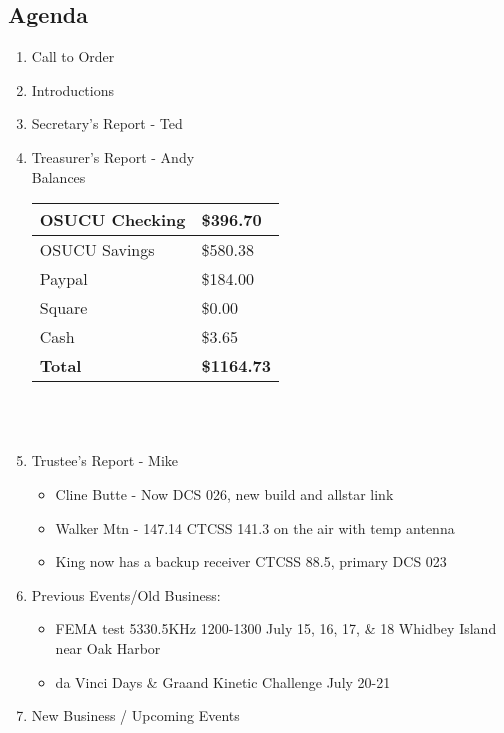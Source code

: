 \documentclass[letter,11pt]{extarticle}
\begin{document}
	\subsection*{Agenda}
	\begin{enumerate}
		\item Call to Order
		\item Introductions
		\item Secretary's Report - Ted
		\item Treasurer's Report - Andy \\
				Balances 
			\begin{tabular}{|l|l|} \hline
				OSUCU Checking & \$396.70 \\ \hline
				OSUCU Savings & \$580.38 \\ \hline
				Paypal & \$184.00 \\ \hline
				Square & \$0.00 \\ \hline
				Cash & \$3.65 \\ \hline
				\textbf{Total} & \textbf{\$1164.73} \\ \hline
			\end{tabular} \\ \\
		\item Trustee's Report - Mike
			\begin{itemize}
				\item Cline Butte - Now DCS 026, new build and allstar link
				\item Walker Mtn - 147.14 CTCSS 141.3 on the air with temp antenna
				\item King now has a backup receiver CTCSS 88.5, primary DCS 023
			\end{itemize}
		\item Previous Events/Old Business:
		\begin{itemize}
				\item FEMA test 5330.5KHz 1200-1300 July 15, 16, 17, \& 18 Whidbey Island near Oak Harbor
				\item da Vinci Days \& Graand Kinetic Challenge July 20-21
		\end{itemize}
			
		\item  New Business / Upcoming Events
			\begin{itemize}


\end{itemize}
\end{enumerate}
\end{document}
